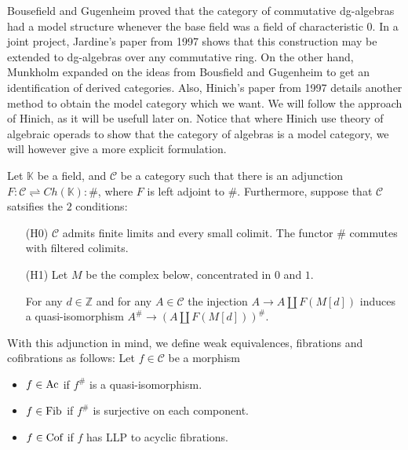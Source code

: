 \documentclass[../thesis.tex]{subfiles}
\begin{document}
            Bousefield and Gugenheim \cite{Bousfield76} proved that the category of commutative dg-algebras had a model structure whenever the base field was a field of characteristic $0$. In a joint project, Jardine's paper from 1997 \cite{Jardine97} shows that this construction may be extended to dg-algebras over any commutative ring. On the other hand, Munkholm expanded on the ideas from Bousfield and Gugenheim to get an identification of derived categories. Also, Hinich's paper from 1997 \cite{Hinich97} details another method to obtain the model category which we want. We will follow the approach of Hinich, as it will be usefull later on. Notice that where Hinich use theory of algebraic operads to show that the category of algebras is a model category, we will however give a more explicit formulation.

            Let $\mathbb{K}$ be a field, and $\mathcal{C}$ be a category such that there is an adjunction $F:\mathcal{C}\rightleftharpoons Ch(\mathbb{K}):\#$, where $F$ is left adjoint to $\#$. Furthermore, suppose that $\mathcal{C}$ satsifies the $2$ conditions:
            \begin{itemize}
                \item[(H0)] $\mathcal{C}$ admits finite limits and every small colimit. The functor $\#$ commutes with filtered colimits.
                \item[(H1)] Let $M$ be the complex below, concentrated in $0$ and $1$.
                \begin{center}
                \end{center}
                For any $d\in \mathbb{Z}$ and for any $A\in\mathcal{C}$ the injection $A \rightarrow A \coprod F(M[d])$ induces a quasi-isomorphism $A^\# \rightarrow (A\coprod F(M[d]))^\#$.
            \end{itemize}
                
            With this adjunction in mind, we define weak equivalences, fibrations and cofibrations as follows:
            Let $f\in \mathcal{C}$ be a morphism
            \begin{itemize}
                \item $f\in \tt{Ac}$ if $f^\#$ is a quasi-isomorphism.
                \item $f\in \tt{Fib}$ if $f^\#$ is surjective on each component.
                \item $f\in \tt{Cof}$ if $f$ has LLP to acyclic fibrations.
            \end{itemize}
\end{document}
